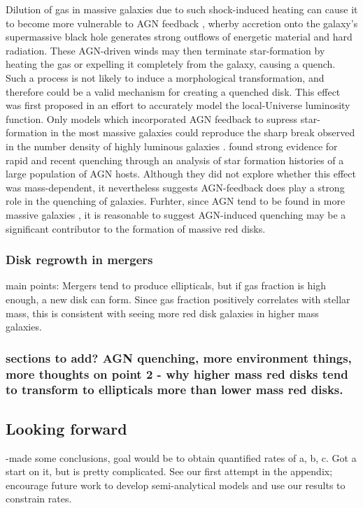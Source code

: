 \documentclass[useAMS,usenatbib]{mn2e}
\begin{document}
Dilution of gas in massive galaxies due to such shock-induced heating can cause it to become more vulnerable to AGN feedback \citep{Dekel2006}, wherby accretion onto the galaxy's supermassive black hole generates strong outflows of energetic material and hard radiation. These AGN-driven winds may then terminate star-formation by heating the gas or expelling it completely from the galaxy, causing a quench. Such a process is not likely to induce a morphological transformation, and therefore could be a valid mechanism for creating a quenched disk. This effect was first proposed in an effort to accurately model the local-Universe luminosity function. Only models which incorporated AGN feedback to supress star-formation in the most massive galaxies could reproduce the sharp break observed in the number density of highly luminous galaxies \citep{Benson2003,DiMatteo2005,Bower2006,Croton2006,Somerville2008}. \citet{Smethurst2016} found strong evidence for rapid and recent quenching through an analysis of star formation histories of a large population of AGN hosts. Although they did not explore whether this effect was mass-dependent, it nevertheless suggests AGN-feedback does play a strong role in the quenching of galaxies. Furhter, since AGN tend to be found in more massive galaxies \citep{Galloway2015}, it is reasonable to suggest AGN-induced quenching may be a significant contributor to the formation of massive red disks. 

\subsubsection{Disk regrowth in mergers}
main points: Mergers tend to produce ellipticals, but if gas fraction is high enough, a new disk can form. Since gas fraction positively correlates with stellar mass, this is consistent with seeing more red disk galaxies in higher mass galaxies. \citep{Sparre2016,Springel2005a,Robertson2006,Governato2009}

\subsubsection{sections to add? AGN quenching, more environment things, more thoughts on point 2 - why higher mass red disks tend to transform to ellipticals more than lower mass red disks.}

\subsection{Looking forward}
-made some conclusions, goal would be to obtain quantified rates of a, b, c. Got a start on it, but is pretty complicated. See our first attempt in the appendix; encourage future work to develop semi-analytical models and use our results to constrain rates. 
\end{document}
